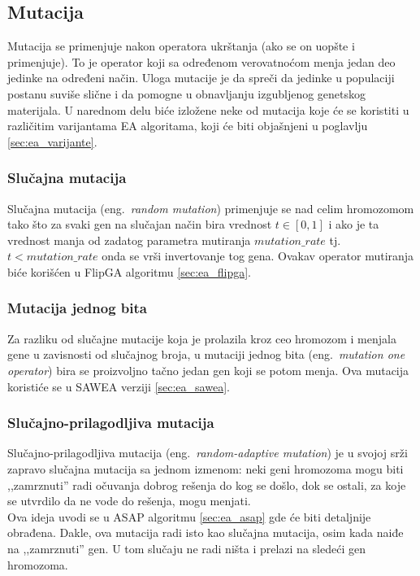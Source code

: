 \documentclass[a4paper]{article}
\begin{document}
\subsection{Mutacija}
 \label{sec:ea_mutacija}
Mutacija \cite{vi_Janicic} se primenjuje nakon operatora ukrštanja 
(ako se on uopšte i primenjuje). 
To je operator koji sa određenom verovatnoćom menja jedan deo jedinke na određeni način. 
Uloga mutacije je da spreči da jedinke u populaciji postanu suviše slične 
i da pomogne u obnavljanju izgubljenog genetskog materijala.
U narednom delu biće izložene neke od mutacija koje će se koristiti u 
različitim varijantama EA algoritama, koji će biti objašnjeni u poglavlju
\ref{sec:ea_varijante}.

\subsubsection{Slučajna mutacija}
\label{sec:ea_slucajna_mutacija}
Slučajna mutacija (eng.~{\em random mutation}) primenjuje se nad celim hromozomom 
tako što za svaki gen na slučajan način bira vrednost $t \in [0,1]$ 
i ako je ta vrednost manja od zadatog parametra mutiranja $mutation\_rate$ 
tj. $ t < mutation\_rate$ onda se vrši invertovanje tog gena.
Ovakav operator mutiranja biće korišćen u FlipGA algoritmu \ref{sec:ea_flipga}.

\subsubsection{Mutacija jednog bita}
\label{sec:ea_mutacija_one}
Za razliku od slučajne mutacije koja je prolazila kroz ceo hromozom i menjala gene u
zavisnosti od slučajnog broja, u mutaciji jednog bita (eng.~{\em mutation one operator})
bira se proizvoljno tačno jedan gen koji se potom menja. 
Ova mutacija koristiće se u SAWEA verziji \ref{sec:ea_sawea}.

\subsubsection{Slučajno-prilagodljiva mutacija}
\label{sec:ea_slucajno_prilagodljiva_mutacija}
Slučajno-prilagodljiva mutacija (eng.~{\em random-adaptive mutation}) \cite{adaptiveEA} 
je u svojoj srži zapravo slučajna mutacija sa jednom izmenom:
neki geni hromozoma mogu biti ,,zamrznuti'' radi očuvanja dobrog rešenja do kog se došlo,
dok se ostali, za koje se utvrdilo da ne vode do rešenja, mogu menjati.\\

Ova ideja uvodi se u ASAP algoritmu \ref{sec:ea_asap} gde će biti detaljnije obrađena.
Dakle, ova mutacija radi isto kao slučajna mutacija, osim kada naiđe na ,,zamrznuti'' gen.
U tom slučaju ne radi ništa i prelazi na sledeći gen hromozoma.
\end{document}
